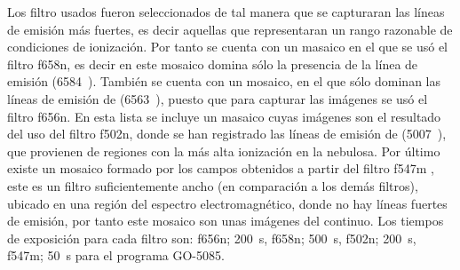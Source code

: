  Los filtro usados fueron seleccionados de tal manera que se capturaran las líneas de emisión más fuertes, es decir aquellas que representaran un rango razonable de condiciones de ionización. Por tanto se cuenta con un masaico en el que se usó el filtro f658n, es decir en este mosaico domina sólo la presencia de la línea de emisión \nii{} (6584~\A{}). También se cuenta con un mosaico, en el que sólo dominan las líneas de emisión de \ha{} (6563~\A{}), puesto que para capturar las imágenes se usó el filtro f656n. En esta lista se incluye un masaico cuyas imágenes son el resultado del uso del filtro f502n, donde se han registrado las líneas de emisión de \oiii{} (5007~\A{}), que provienen de regiones con la más alta ionización en la nebulosa. Por último existe un mosaico formado por los campos obtenidos a partir del filtro f547m \citep{Burrows:1995}, este es un filtro suficientemente ancho (en comparación a los demás filtros), ubicado en una región del espectro electromagnético, donde no hay líneas fuertes de emisión, por tanto este mosaico son unas imágenes del continuo. Los tiempos de exposición para cada filtro son: f656n;  200~s, f658n; 500~s, f502n; 200~s, f547m; 50~s para el programa GO-5085. 



% 

% 
